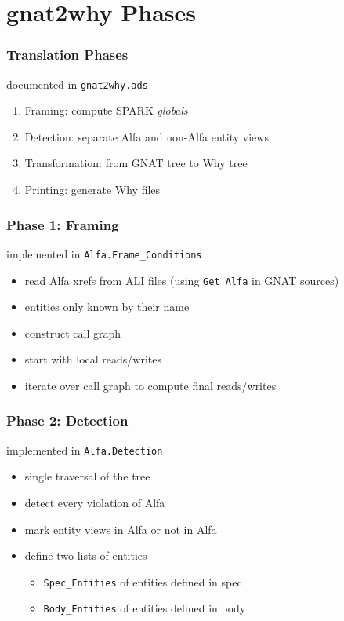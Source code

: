 \documentclass{beamer}
\newcommand{\vs}{\vspace{0.5cm}}
\newenvironment{specialframe}{%
  \begin{frame}[fragile,environment=specialframe]}{\end{frame}}
\begin{document}
\section{gnat2why Phases}

\begin{specialframe}\frametitle{Translation Phases}

  documented in \verb|gnat2why.ads|

  \vs

  \begin{enumerate}
  \item Framing: compute SPARK \emph{globals}
  \item Detection: separate Alfa and non-Alfa entity views
  \item Transformation: from GNAT tree to Why tree
  \item Printing: generate Why files
  \end{enumerate}
\end{specialframe}

\begin{specialframe}\frametitle{Phase 1: Framing}

  implemented in \verb|Alfa.Frame_Conditions|

  \vs

  \begin{itemize}
  \item read Alfa xrefs from ALI files (using \verb|Get_Alfa| in GNAT sources)
  \item entities only known by their name
  \item construct call graph
  \item start with local reads/writes
  \item iterate over call graph to compute final reads/writes
  \end{itemize}
\end{specialframe}

\begin{specialframe}\frametitle{Phase 2: Detection}

  implemented in \verb|Alfa.Detection|

  \vs

  \begin{itemize}
  \item single traversal of the tree
  \item detect every violation of Alfa
  \item mark entity views in Alfa or not in Alfa
  \item define two lists of entities
    \begin{itemize}
    \item \verb|Spec_Entities| of entities defined in spec
    \item \verb|Body_Entities| of entities defined in body
    \end{itemize}
  \end{itemize}
\end{specialframe}
\end{document}
